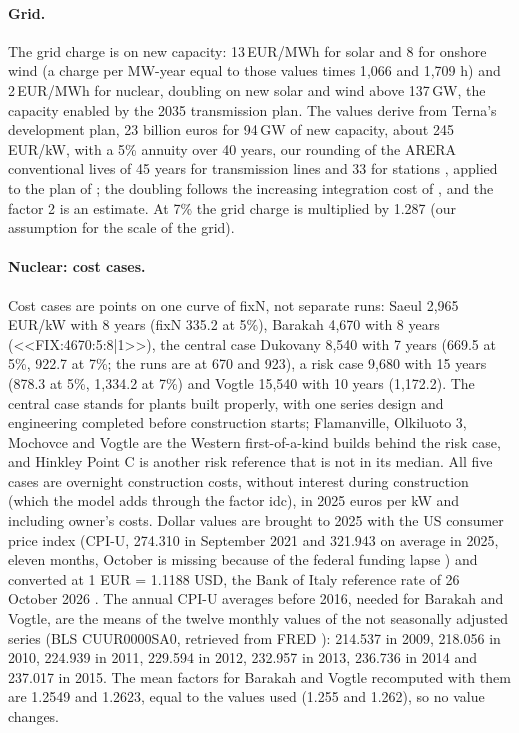 \paragraph{Grid.} The grid charge is on new capacity: 13\,EUR/MWh for solar and 8 for onshore wind (a charge per MW-year equal to those values times 1{,}066 and 1{,}709 h) and 2\,EUR/MWh for nuclear, doubling on new solar and wind above 137\,GW, the capacity enabled by the 2035 transmission plan. The values derive from Terna's development plan, 23 billion euros for 94\,GW of new capacity, about 245\,EUR/kW, with a 5\% annuity over 40 years, our rounding of the ARERA conventional lives of 45 years for transmission lines and 33 for stations \citep{ARERA615}, applied to the plan of \citet{TernaPdS2025}; the doubling follows the increasing integration cost of \citet{Ueckerdt2013}, and the factor 2 is an estimate. At 7\% the grid charge is multiplied by 1.287 (our assumption for the scale of the grid).

\paragraph{Nuclear: cost cases.} Cost cases are points on one curve of fixN, not separate runs: Saeul 2{,}965\,EUR/kW with 8 years (fixN 335.2 at 5\%), Barakah 4{,}670 with 8 years (<<FIX:4670:5:8|1>>), the central case Dukovany 8{,}540 with 7 years (669.5 at 5\%, 922.7 at 7\%; the runs are at 670 and 923), a risk case 9{,}680 with 15 years (878.3 at 5\%, 1{,}334.2 at 7\%) and Vogtle 15{,}540 with 10 years (1{,}172.2). The central case stands for plants built properly, with one series design and engineering completed before construction starts; Flamanville, Olkiluoto 3, Mochovce and Vogtle are the Western first-of-a-kind builds behind the risk case, and Hinkley Point C is another risk reference that is not in its median. All five cases are overnight construction costs, without interest during construction (which the model adds through the factor idc), in 2025 euros per kW and including owner's costs. Dollar values are brought to 2025 with the US consumer price index (CPI-U, 274.310 in September 2021 and 321.943 on average in 2025, eleven months, October is missing because of the federal funding lapse \citep{BLSCPI}) and converted at 1 EUR = 1.1188 USD, the Bank of Italy reference rate of 26 October 2026 \citep{BancaItaliaFX}. The annual CPI-U averages before 2016, needed for Barakah and Vogtle, are the means of the twelve monthly values of the not seasonally adjusted series (BLS CUUR0000SA0, retrieved from FRED \citep{FREDCPI}): 214.537 in 2009, 218.056 in 2010, 224.939 in 2011, 229.594 in 2012, 232.957 in 2013, 236.736 in 2014 and 237.017 in 2015. The mean factors for Barakah and Vogtle recomputed with them are 1.2549 and 1.2623, equal to the values used (1.255 and 1.262), so no value changes.

